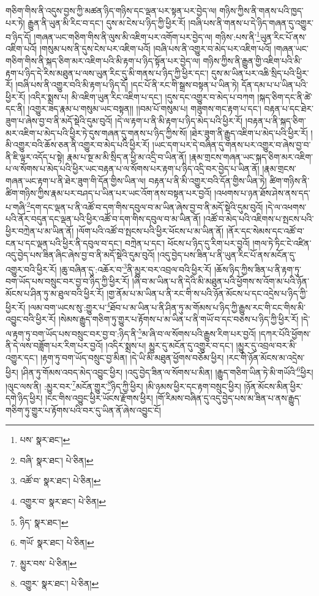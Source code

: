 གཅིག་གིས་ནི་འདུས་བྱས་ཀྱི་མཚན་ཉིད་གཉིས་དང་ལྡན་པར་སྟན་པར་བྱེད་ལ། གཉིས་ཀྱིས་ནི་གནས་པའི་ཁྱད་པར་ཏེ། རྒྱུན་ནི་ཡུན་མི་རིང་བ་དང་། དུས་མ་ངེས་པ་ཉིད་ཀྱི་ཕྱིར་རོ། །བཞི་པས་ནི་གནས་པ་དེ་ཉིད་གཞན་དུ་འགྱུར་བ་ཉིད་དོ། །གཞན་ཡང་གཅིག་གིས་ནི་ལུས་མི་འཇིག་པར་འགོག་པར་བྱེད་ལ། གཉིས་:པས་ནི་\footnote{པས་  སྣར་ཐང་། }ཡུན་རིང་པོ་ནས་འཇིག་པའོ། །གསུམ་པས་ནི་དུས་ངེས་པར་འཇིག་པའོ། །བཞི་པས་ནི་འགྱུར་བ་མེད་པར་འཇིག་པའོ། །གཞན་ཡང་གཅིག་གིས་ནི་སྐད་ཅིག་མར་འཇིག་པའི་མི་རྟག་པ་ཉིད་སྟོན་པར་བྱེད་ལ། གཉིས་ཀྱིས་ནི་རྒྱུན་གྱི་འཇིག་པའི་མི་རྟག་པ་ཉིད་དེ་རིས་མཐུན་པ་ལས་ཡུན་རིང་དུ་མི་གནས་པ་ཉིད་ཀྱི་ཕྱིར་དང་། དུས་མ་ཡིན་པར་འཆི་སྲིད་པའི་ཕྱིར་རོ། །བཞི་པས་ནི་འགྱུར་བའི་མི་རྟག་པ་ཉིད་དོ། །དང་པོ་ནི་རང་གི་སྒྲས་བསྟན་པ་ཡིན་ཏེ། དོན་དམ་པ་པ་ཡིན་པའི་ཕྱིར་རོ། །འདིར་སྨྲས་པ། མི་འཇིག་ཡུན་རིང་འཇིག་པ་དང་། །དུས་དང་འགྱུར་བ་མེད་པ་བཀག །སྐད་ཅིག་དང་ནི་ཚེ་དང་ནི། །འགྱུར་ཟད་རྣམ་པ་གསུམ་ཡང་བསྟན།། །།བམ་པོ་གསུམ་པ། གཟུགས་གང་རྟག་པ་དང་། བརྟན་པ་དང་ཐེར་ཟུག་པ་ཞེས་བྱ་བ་ནི་མདོ་སྡེའི་དུམ་བུའོ། །དེ་ལ་རྟག་པ་ནི་མི་རྟག་པ་ཉིད་མེད་པའི་ཕྱིར་རོ། །བརྟན་པ་ནི་སྐད་ཅིག་མར་འཇིག་པ་མེད་པའི་ཕྱིར་ཏེ་དུས་གཞན་དུ་གནས་པ་ཉིད་ཀྱིས་སོ། །ཐེར་ཟུག་ནི་རྒྱུད་འཇིག་པ་མེད་པའི་ཕྱིར་རོ། །མི་འགྱུར་བའི་ཆོས་ཅན་ནི་འགྱུར་བ་མེད་པའི་ཕྱིར་རོ། །ཡང་དག་པར་དེ་བཞིན་དུ་གནས་པར་འགྱུར་བ་ཞེས་བྱ་བ་ནི་ཇི་ལྟར་འདོད་པ་སྟེ། རྣམ་པ་སྔ་མ་མི་སྲིད་ན་ཕྱི་མ་འདྲི་བ་ཡིན་ནོ། །རྣམ་གྲངས་གཞན་ཡང་སྐད་ཅིག་མར་འཇིག་པ་ལ་སོགས་པ་མེད་པའི་ཕྱིར་ཡང་བརྟན་པ་ལ་སོགས་པར་རྟག་པ་ཉིད་འདྲི་བར་བྱེད་པ་ཡིན་ནོ། །རྣམ་གྲངས་གཞན་ཡང་རྟག་པ་ནི་ཐེར་ཟུག་གི་དོན་གྱིས་ཡིན་ལ། བརྟན་པ་ནི་མི་འགྱུར་བའི་དོན་གྱིས་ཡིན་ཏེ། ཚིག་གཉིས་ནི་ཚིག་གཉིས་ཀྱིས་རྣམ་པར་བཤད་པ་ཡིན་པར་ཡང་འོག་ནས་བསྟན་པར་བྱའོ། །འཕགས་པ་ཉན་ཐོས་ཤེས་ནས་དད་པ་གཞི་\footnote{བཞི་  སྣར་ཐང་།  པེ་ཅིན། }དག་དང་ལྡན་པ་ནི་འཚོ་བ་དག་གིས་དབུལ་བ་མ་ཡིན་ཞེས་བྱ་བ་ནི་མདོ་སྡེའི་དུམ་བུའོ། །དེ་ལ་འཕགས་པའི་ནོར་བདུན་དང་ལྡན་པའི་ཕྱིར་འཚོ་བ་དག་གིས་དབུལ་བ་མ་ཡིན་ནོ། །འཚོ་བ་མེད་པའི་འཇིགས་པ་སྤངས་པའི་ཕྱིར་བཀྲེན་པ་མ་ཡིན་ནོ། །ལོག་པའི་འཚོ་བ་སྤངས་པའི་ཕྱིར་ཕོངས་པ་མ་ཡིན་ནོ། །ནོར་དང་སེམས་དང་འཚོ་བ་ངན་པ་དང་ལྡན་པའི་ཕྱིར་ནི་དབུལ་བ་དང་། བཀྲེན་པ་དང་། ཕོངས་པ་ཉིད་དུ་རིག་པར་བྱའོ། །གལ་ཏེ་ཏིང་ངེ་འཛིན་འདུ་བྱེད་པས་ཟིན་ཞིང་ཞེས་བྱ་བ་ནི་མདོ་སྡེའི་དུམ་བུའོ། །འདུ་བྱེད་པས་ཟིན་པ་ནི་ཡུན་རིང་པོ་ནས་མངོན་དུ་འགྱུར་བའི་ཕྱིར་རོ། །ཆུ་བཞིན་དུ་:འཆོར་བ་\footnote{འཚོ་བ་  སྣར་ཐང་།  པེ་ཅིན། }ནི་མྱུར་བར་འབྲལ་བའི་ཕྱིར་རོ། །ཆོས་ཉིད་ཀྱིས་ཟིན་པ་ནི་རྟག་ཏུ་བག་ཡོད་པས་བསྲུང་བར་བྱ་བ་ཉིད་ཀྱི་ཕྱིར་རོ། །ཞི་བ་མ་ཡིན་པ་ནི་དེའི་མི་མཐུན་པའི་ཕྱོགས་ས་འོག་མ་པའི་ཉོན་མོངས་པ་ཤིན་ཏུ་མ་ཐུལ་བའི་ཕྱིར་རོ། །གྱ་ནོམ་པ་མ་ཡིན་པ་ནི་རང་གི་ས་པའི་ཉོན་མོངས་པ་དང་འདྲེས་པ་ཉིད་ཀྱི་ཕྱིར་རོ། །ལམ་བག་ཡངས་སུ་:གྱུར་པ་\footnote{འགྱུར་བ་  སྣར་ཐང་།  པེ་ཅིན། }ཐོབ་པ་མ་ཡིན་པ་ནི་ཤིན་ཏུ་མ་གོམས་པ་ཉིད་ཀྱི་རྒྱུས་རང་གི་ངང་གིས་མི་འབྱུང་བའི་ཕྱིར་རོ། །སེམས་རྒྱུད་གཅིག་ཏུ་གྱུར་པ་རྟོགས་པ་མ་ཡིན་པ་ནི་གཡོ་བ་དང་བཅས་པ་ཉིད་ཀྱི་ཕྱིར་རོ། །དེ་ལ་རྟག་ཏུ་བག་ཡོད་པས་བསྲུང་བར་བྱ་བ་:ཉིད་ནི་\footnote{ཉིད་  སྣར་ཐང་། }མ་ཞི་བ་ལ་སོགས་པའི་རྒྱུས་རིག་པར་བྱའོ། །དཀར་པོའི་ཕྱོགས་ནི་དེ་ལས་བཟློག་པར་རིག་པར་བྱའོ། །འདིར་སྨྲས་པ། མྱུར་དུ་མངོན་དུ་འགྱུར་བ་དང་། །མྱུར་དུ་འབྲལ་བར་མི་འགྱུར་དང་། །རྟག་ཏུ་བག་ཡོད་བསྲུང་བྱ་མིན། །དེ་ཡི་མི་མཐུན་ཕྱོགས་བཅོམ་ཕྱིར། །རང་གི་ཉོན་མོངས་མ་འདྲེས་ཕྱིར། །ཤིན་ཏུ་གོམས་འབད་མེད་འབྱུང་ཕྱིར། །འདུ་བྱེད་ཟིན་ལ་སོགས་པ་མིན། །རྒྱུད་གཅིག་ཡིན་ཏེ་མི་གཡོའི་\footnote{གཡོ་  སྣར་ཐང་།  པེ་ཅིན། }ཕྱིར། །ལུང་ལས་ནི། :མྱུར་བར་\footnote{མྱུར་བས་  པེ་ཅིན། }མངོན་གྱུར་\footnote{འགྱུར་  སྣར་ཐང་།  པེ་ཅིན། }ཉིད་ཀྱི་ཕྱིར། །མི་ཉམས་ཕྱིར་དང་རྟག་བསྲུང་ཕྱིར། །ཉོན་མོངས་མིན་ཕྱིར་དགེ་ཉིད་ཕྱིར། །ངང་གིས་འབྱུང་ཕྱིར་ཡོངས་རྫོགས་ཕྱིར། །གོ་རིམས་བཞིན་དུ་འདུ་བྱེད་པས་མ་ཟིན་པ་ནས་རྒྱུད་གཅིག་ཏུ་གྱུར་པ་རྟོགས་པའི་བར་དུ་ཡིན་ནོ་ཞེས་འབྱུང་ངོ། 